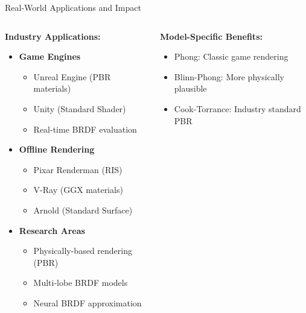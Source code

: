\documentclass[aspectratio=169]{beamer}
\begin{document}
\begin{frame}{Real-World Applications and Impact}
    \begin{columns}
        \begin{column}{0.6\textwidth}
            \textbf{Industry Applications:}
            \begin{itemize}
                \item<1-> \textbf{Game Engines}
                \begin{itemize}
                    \item Unreal Engine (PBR materials)
                    \item Unity (Standard Shader)
                    \item Real-time BRDF evaluation
                \end{itemize}
                \item<2-> \textbf{Offline Rendering}
                \begin{itemize}
                    \item Pixar Renderman (RIS)
                    \item V-Ray (GGX materials)
                    \item Arnold (Standard Surface)
                \end{itemize}
                \item<3-> \textbf{Research Areas}
                \begin{itemize}
                    \item Physically-based rendering (PBR)
                    \item Multi-lobe BRDF models
                    \item Neural BRDF approximation
                \end{itemize}
            \end{itemize}
        \end{column}
        \begin{column}{0.4\textwidth}
            \textbf{Model-Specific Benefits:}
            \begin{itemize}
                \item Phong: Classic game rendering
                \item Blinn-Phong: More physically plausible
                \item Cook-Torrance: Industry standard PBR
            \end{itemize}
            

\end{column}
\end{columns}
\end{frame}
\end{document}
